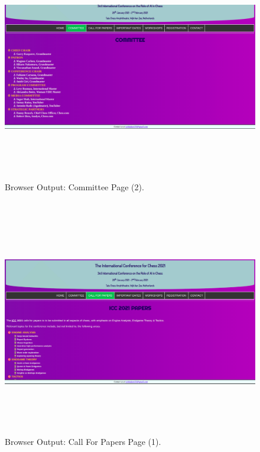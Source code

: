 \documentclass[12pt, a4]{article}
\begin{document}
\newpage
\begin{figure}[h]
\centering
\caption{Browser Output: Committee Page (2).}
\includegraphics[height=10cm, width=18cm, keepaspectratio]{Output/Committee-2.png}
\end{figure}

\newpage
\subsection*{}
\begin{figure}[h]
\centering
\caption{Browser Output: Call For Papers Page (1).}
\includegraphics[height=10cm, width=18cm, keepaspectratio]{Output/Papers.png}
\end{figure}
\end{document}
